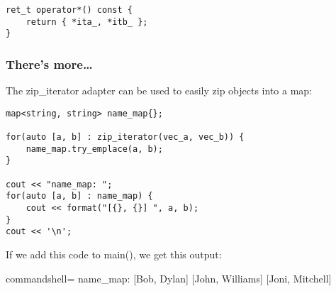 \begin{lstlisting}[style=styleCXX]
ret_t operator*() const {
	return { *ita_, *itb_ };
}
\end{lstlisting}

\subsubsection{There's more…}

The zip\_iterator adapter can be used to easily zip objects into a map:

\begin{lstlisting}[style=styleCXX]
map<string, string> name_map{};

for(auto [a, b] : zip_iterator(vec_a, vec_b)) {
	name_map.try_emplace(a, b);
}

cout << "name_map: ";
for(auto [a, b] : name_map) {
	cout << format("[{}, {}] ", a, b);
}
cout << '\n';
\end{lstlisting}

If we add this code to main(), we get this output:

\begin{tcblisting}{commandshell={}}
name_map: [Bob, Dylan] [John, Williams] [Joni, Mitchell]
\end{tcblisting}












